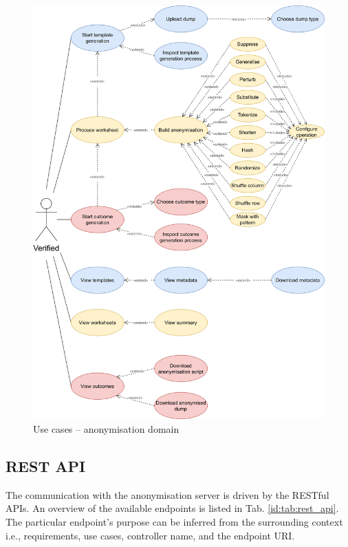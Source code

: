 \documentclass[a4paper,twoside,12pt]{book}
\begin{document}
\begin{figure}
  \centering
  \includegraphics[width=\linewidth]{img/use_cases_anonymisation.png}
  \caption{Use cases – anonymisation domain}
  \label{fig:use_cases_anonymisation}
\end{figure}

\subsection{REST API}

The communication with the anonymisation server is driven by the RESTful APIs. An overview of the available endpoints is listed in Tab. \ref{id:tab:rest_api}. The particular endpoint's purpose can be inferred from the surrounding context i.e., requirements, use cases, controller name, and the endpoint URI.
\end{document}
